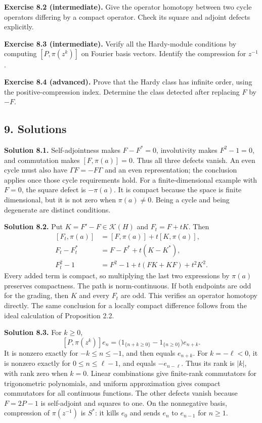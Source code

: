 \documentclass[
  11pt,
]{article}
\begin{document}
\textbf{Exercise 8.2 (intermediate).} Give the operator homotopy between
two cycle operators differing by a compact operator. Check its square
and adjoint defects explicitly.

\textbf{Exercise 8.3 (intermediate).} Verify all the Hardy-module
conditions by computing \([P,\pi(z^k)]\) on Fourier basis vectors.
Identify the compression for \(z^{-1}\).

\textbf{Exercise 8.4 (advanced).} Prove that the Hardy class has
infinite order, using the positive-compression index. Determine the
class detected after replacing \(F\) by \(-F\).

\subsection{9. Solutions}\label{solutions}

\textbf{Solution 8.1.} Self-adjointness makes \(F-F^*=0\), involutivity
makes \(F^2-1=0\), and commutation makes \([F,\pi(a)]=0\). Thus all
three defects vanish. An even cycle must also have \(\Gamma F=-F\Gamma\)
and an even representation; the conclusion applies once those cycle
requirements hold. For a finite-dimensional example with \(F=0\), the
square defect is \(-\pi(a)\). It is compact because the space is finite
dimensional, but it is not zero when \(\pi(a)\ne0\). Being a cycle and
being degenerate are distinct conditions.

\textbf{Solution 8.2.} Put \(K=F'-F\in\mathcal K(H)\) and \(F_t=F+tK\).
Then \[
\begin{aligned}
\left[F_t,\pi(a)\right]&=[F,\pi(a)]+t[K,\pi(a)],\\
F_t-F_t^*&=F-F^*+t(K-K^*),\\
F_t^2-1&=F^2-1+t(FK+KF)+t^2K^2.
\end{aligned}
\] Every added term is compact, so multiplying the last two expressions
by \(\pi(a)\) preserves compactness. The path is norm-continuous. If
both endpoints are odd for the grading, then \(K\) and every \(F_t\) are
odd. This verifies an operator homotopy directly. The same conclusion
for a locally compact difference follows from the ideal calculation of
Proposition 2.2.

\textbf{Solution 8.3.} For \(k\geq0\), \[
[P,\pi(z^k)]e_n
=\big(1_{\{n+k\geq0\}}-1_{\{n\geq0\}}\big)e_{n+k}.
\] It is nonzero exactly for \(-k\leq n\leq-1\), and then equals
\(e_{n+k}\). For \(k=-\ell<0\), it is nonzero exactly for
\(0\leq n\leq\ell-1\), and equals \(-e_{n-\ell}\). Thus its rank is
\(|k|\), with rank zero when \(k=0\). Linear combinations give
finite-rank commutators for trigonometric polynomials, and uniform
approximation gives compact commutators for all continuous functions.
The other defects vanish because \(F=2P-1\) is self-adjoint and squares
to one. On the nonnegative basis, compression of \(\pi(z^{-1})\) is
\(S^*\): it kills \(e_0\) and sends \(e_n\) to \(e_{n-1}\) for
\(n\geq1\).
\end{document}
